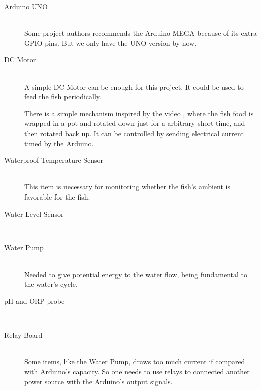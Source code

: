\begin{description}
    \item[Arduino UNO] \hfill \\
        Some project authors recommends the Arduino MEGA because of its extra GPIO pins.
        But we only have the UNO version by now.
    \item[DC Motor] \hfill \\
        A simple DC Motor can be enough for this project.
        It could be used to feed the fish periodically.

        There is a simple mechanism inspired by the video \cite{dcmotor},
        where the fish food is wrapped in a pot and rotated down just for a arbitrary short time,
        and then rotated back up.
        It can be controlled by sending electrical current timed by the Arduino.
    \item[Waterproof Temperature Sensor] \hfill \\
        This item is necessary for monitoring whether the fish's ambient is favorable for the fish.
    \item[Water Level Sensor] \hfill \\
    \item[Water Pump] \hfill \\
        Needed to give potential energy to the water flow,
        being fundamental to the water's cycle.
    \item[pH and ORP probe] \hfill \\
    \item[Relay Board] \hfill \\
        Some items,
        like the Water Pump,
        draws too much current if compared with Arduino's capacity.
        So one needs to use relays to connected another power source with the Arduino's output signals.
\end{description}

